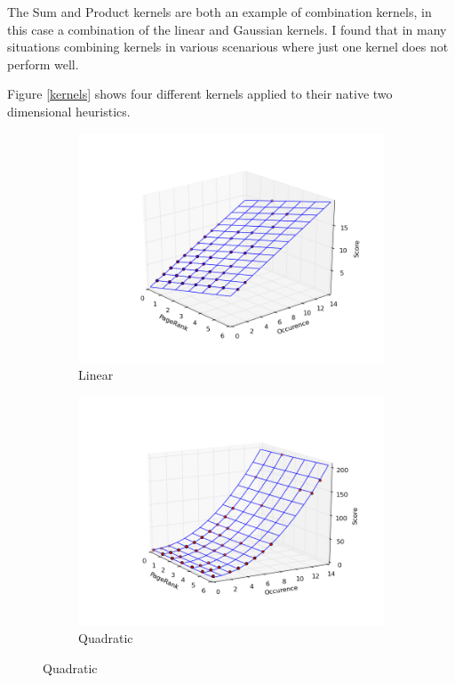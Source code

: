 \documentclass[12pt,notitlepage,twoside]{scrreprt}
\begin{document}
The Sum and Product kernels are both an example of combination kernels, in this case a
combination of the linear and Gaussian kernels. I found that in many situations combining
kernels in various scenarious where just one kernel does not perform well.

Figure \ref{kernels} shows four different kernels applied to their native two dimensional heuristics. 
\begin{figure}[h!]
\centering
\begin{subfigure}[b]{.49\textwidth}
  \centering
  \includegraphics[width=\linewidth]{figs/lin.png}
  \caption{Linear}
  \label{lin}
\end{subfigure}
\begin{subfigure}[b]{.49\textwidth}
  \centering
  \includegraphics[width=\linewidth]{figs/quad.png}
  \caption{Quadratic}
  \label{quad}
\end{subfigure}


\end{figure}
\end{document}
